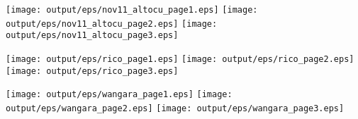 \documentclass[11pt]{article}
\begin{document}
\begin{center}

\texttt{[image: output/eps/nov11\_altocu\_page1.eps]}
\texttt{[image: output/eps/nov11\_altocu\_page2.eps]}
\texttt{[image: output/eps/nov11\_altocu\_page3.eps]}
\end{center}
\newpage

\begin{center}

\texttt{[image: output/eps/rico\_page1.eps]}
\texttt{[image: output/eps/rico\_page2.eps]}
\texttt{[image: output/eps/rico\_page3.eps]}
\end{center}
\newpage

\begin{center}

\texttt{[image: output/eps/wangara\_page1.eps]}
\texttt{[image: output/eps/wangara\_page2.eps]}
\texttt{[image: output/eps/wangara\_page3.eps]}
\end{center}
\newpage
\end{document}
